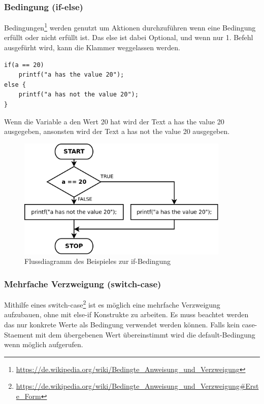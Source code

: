 \subsubsection{Bedingung (if-else)}

Bedingungen\footnote{\url{https://de.wikipedia.org/wiki/Bedingte_Anweisung_und_Verzweigung}} werden genutzt um Aktionen durchzuf\"uhren wenn eine Bedingung erf\"ullt oder nicht erf\"ullt ist. Das else ist dabei Optional, und wenn nur 1. Befehl ausgef\"urht wird, kann die Klammer weggelassen werden.


\begin{lstlisting}[language=CMM]
if(a == 20)
	printf("a has the value 20");
else {
	printf("a has not the value 20");
}
\end{lstlisting}

Wenn die Variable a den Wert 20 hat wird der Text \glqq{}a has the value 20\grqq{} ausgegeben, ansonsten wird der Text \glqq{}a has not the value 20\grqq{} ausgegeben.

\begin{figure}[h]
\centering
\includegraphics[width=0.9\textwidth]{./media/images/compiler/language_specification_if_condition.png}
\caption{Flussdiagramm des Beispieles zur if-Bedingung}
\label{language_specification_if_condition}
\end{figure}

\newpage
\subsubsection{Mehrfache Verzweigung (switch-case)}

Mithilfe eines switch-case\footnote{\url{https://de.wikipedia.org/wiki/Bedingte_Anweisung_und_Verzweigung\#Erste_Form}} ist es m\"oglich eine mehrfache Verzweigung aufzubauen, ohne mit else-if Konstrukte zu arbeiten. Es muss beachtet werden das nur konkrete Werte als Bedingung verwendet werden k\"onnen. Falls kein case-Staement mit dem \"ubergebenen Wert \"ubereinstimmt wird die default-Bedingung wenn m\"oglich aufgerufen.

